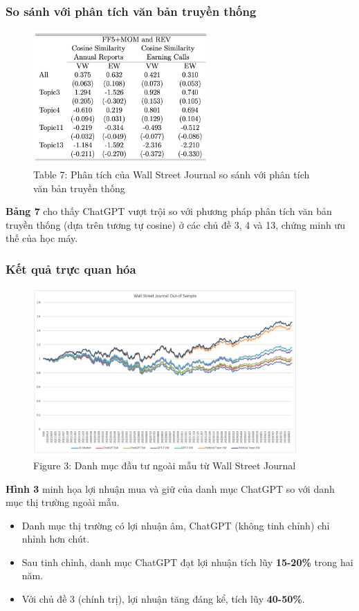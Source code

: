\documentclass[a4paper,12pt]{article}
\begin{document}
\subsubsection{So sánh với phân tích văn bản truyền thống}
\begin{figure}[H]
    \centering
    \includegraphics[width=0.6\textwidth]{table/tab7a.png}
    \caption*{Table 7: Phân tích của Wall Street Journal so sánh với phân tích văn bản truyền thống}
    \label{fig:fig2}
\end{figure}
\textbf{Bảng 7} cho thấy ChatGPT vượt trội so với phương pháp phân tích văn bản truyền thống (dựa trên tương tự cosine) ở các chủ đề 3, 4 và 13, chứng minh ưu thế của học máy.

\subsubsection{Kết quả trực quan hóa}
\begin{figure}[H]
    \centering
    \includegraphics[width=0.9\textwidth]{fig/fig3.png}
    \caption*{Figure 3: Danh mục đầu tư ngoài mẫu từ Wall Street Journal}
    \label{fig:fig2}
\end{figure}
\textbf{Hình 3} minh họa lợi nhuận mua và giữ của danh mục ChatGPT so với danh mục thị trường ngoài mẫu.
\begin{itemize}
    \item Danh mục thị trường có lợi nhuận âm, ChatGPT (không tinh chỉnh) chỉ nhỉnh hơn chút.
    \item Sau tinh chỉnh, danh mục ChatGPT đạt lợi nhuận tích lũy \textbf{15-20\%} trong hai năm.
    \item Với chủ đề 3 (chính trị), lợi nhuận tăng đáng kể, tích lũy \textbf{40-50\%}.
\end{itemize}
\end{document}
